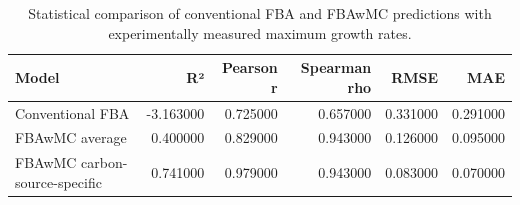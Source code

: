 \begin{table}
\caption{Statistical comparison of conventional FBA and FBAwMC predictions with experimentally measured maximum growth rates.}
\label{tab:statistical_metrics}
\begin{tabular}{lrrrrr}
\toprule
Model & R² & Pearson r & Spearman rho & RMSE & MAE \\
\midrule
Conventional FBA & -3.163000 & 0.725000 & 0.657000 & 0.331000 & 0.291000 \\
FBAwMC average & 0.400000 & 0.829000 & 0.943000 & 0.126000 & 0.095000 \\
FBAwMC carbon-source-specific & 0.741000 & 0.979000 & 0.943000 & 0.083000 & 0.070000 \\
\bottomrule
\end{tabular}
\end{table}
